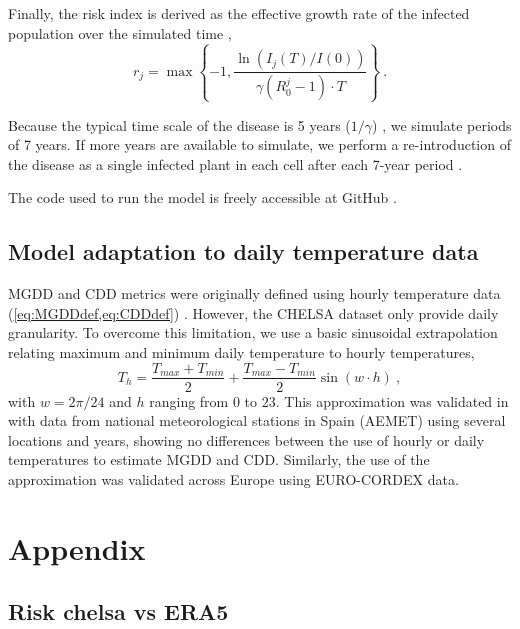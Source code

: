 Finally, the risk index is derived as the effective growth rate of the
infected population over the simulated time \cite{GimenezRomero2022_CommsBio},
\begin{equation}
    r_j=\max\left\{-1, \frac{\ln(I_j(T) / I(0))}{\gamma(R_0^j-1)\cdot
        T}\right\} \ .
\end{equation}

Because the typical time scale of the disease is 5 years ($1/\gamma$)
\cite{Almeida2003}, we simulate periods of 7 years. If more years are available
to simulate, we perform a re-introduction of the disease as a single infected
plant in each cell after each 7-year period
\cite{GimenezRomero2022_CommsBio}.

The code used to run the model is freely accessible at GitHub
\cite{CODE_model}.

\subsection{Model adaptation to daily temperature data}

MGDD and CDD metrics were originally defined using hourly temperature data
(\cref{eq:MGDDdef,eq:CDDdef}) \cite{GimenezRomero2022_CommsBio}. However, the
CHELSA
dataset only provide daily granularity. To overcome this limitation, we use a
basic sinusoidal extrapolation relating maximum and minimum daily temperature
to hourly temperatures,
\begin{equation}
    T_h=\frac{T_{max}+T_{min}}{2} + \frac{T_{max}-T_{min}}{2}\sin(w\cdot h)
    \ ,
\end{equation}
with $w=2\pi/24$ and $h$ ranging from $0$ to $23$. This approximation was
validated in \cite{GimenezRomero2023_PD} with data from national meteorological
stations
in Spain (AEMET) using several locations and years, showing no differences
between the use of hourly or daily temperatures to estimate MGDD and CDD.
Similarly, the use of the approximation was validated across Europe using
EURO-CORDEX data.

\section{Appendix}

\subsection{Risk chelsa vs ERA5}

